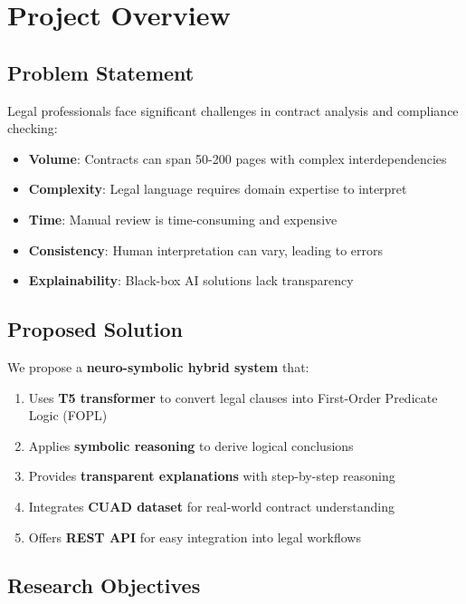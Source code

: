 \documentclass[12pt,a4paper]{article}
\begin{document}
\newpage

\section{Project Overview}

\subsection{Problem Statement}

Legal professionals face significant challenges in contract analysis and compliance checking:
\begin{itemize}
    \item \textbf{Volume}: Contracts can span 50-200 pages with complex interdependencies
    \item \textbf{Complexity}: Legal language requires domain expertise to interpret
    \item \textbf{Time}: Manual review is time-consuming and expensive
    \item \textbf{Consistency}: Human interpretation can vary, leading to errors
    \item \textbf{Explainability}: Black-box AI solutions lack transparency
\end{itemize}

\subsection{Proposed Solution}

We propose a \textbf{neuro-symbolic hybrid system} that:
\begin{enumerate}
    \item Uses \textbf{T5 transformer} to convert legal clauses into First-Order Predicate Logic (FOPL)
    \item Applies \textbf{symbolic reasoning} to derive logical conclusions
    \item Provides \textbf{transparent explanations} with step-by-step reasoning
    \item Integrates \textbf{CUAD dataset} for real-world contract understanding
    \item Offers \textbf{REST API} for easy integration into legal workflows
\end{enumerate}

\subsection{Research Objectives}
\end{document}
